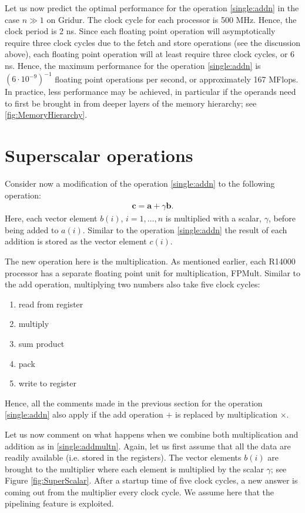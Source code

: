 Let us now predict the optimal performance for the operation \eqref{single:addn}
in the case $n \gg 1$ on Gridur. The clock cycle for each processor is 500 MHz.
Hence, the clock period is 2 ns. Since each floating point operation will
asymptotically require three clock cycles due to the fetch and store operations
(see the discussion above), each floating point operation will at least require
three clock cycles, or 6 ns. Hence, the maximum performance for the operation
\eqref{single:addn} is $(6\cdot 10^{-9})^{-1}$ floating point operations per
second, or approximately 167 MFlops. In practice, less performance may be
achieved, in particular if the operands need to first be brought in from deeper
layers of the memory hierarchy; see \autoref{fig:MemoryHierarchy}.

\section{Superscalar operations}

Consider now a modification of the operation \eqref{single:addn} to the
following operation:
\begin{align}
  \bm c = \bm a + \gamma \bm b.
  \label{single:addmultn}
\end{align}
Here, each vector element $b(i)$, $i=1,\ldots,n$ is multiplied with a scalar,
$\gamma$, before being added to $a(i)$. Similar to the operation
\eqref{single:addn} the result of each addition is stored as the vector element
$c(i)$.

The new operation here is the multiplication. As mentioned earlier, each R14000
processor has a separate floating point unit for multiplication, FPMult. Similar
to the add operation, multiplying two numbers also take five clock cycles:
\begin{enumerate}
\item read from register
\item multiply
\item sum product
\item pack
\item write to register
\end{enumerate}
Hence, all the comments made in the previous section for the operation
\eqref{single:addn} also apply if the add operation $+$ is replaced by
multiplication $\times$.

Let us now comment on what happens when we combine both multiplication and
addition as in \eqref{single:addmultn}. Again, let us first assume that all the
data are readily available (i.e. stored in the registers). The vector elements
$b(i)$ are brought to the multiplier where each element is multiplied by the
scalar $\gamma$; see Figure \autoref{fig:SuperScalar}. After a startup time of
five clock cycles, a new answer is coming out from the multiplier every clock
cycle. We assume here that the pipelining feature is exploited.

